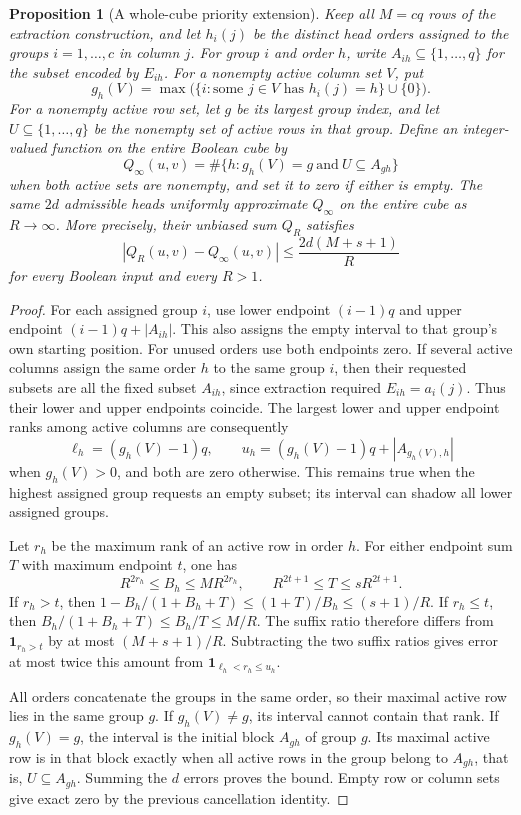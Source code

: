 \documentclass[11pt]{article}
\newtheorem{proposition}[theorem]{Proposition}
\newcommand{\1}{\mathbf 1}
\begin{document}
\begin{proposition}[A whole-cube priority extension]
Keep all $M=cq$ rows of the extraction construction, and let $h_i(j)$ be
the distinct head orders assigned to the groups $i=1,\ldots,c$ in column
$j$. For group $i$ and order $h$, write $A_{ih}\subseteq\{1,\ldots,q\}$
for the subset encoded by $E_{ih}$. For a nonempty active column set $V$,
put
\[
 g_h(V)=\max\bigl(\{i:\text{some }j\in V\text{ has }h_i(j)=h\}\cup\{0\}\bigr).
\]
For a nonempty active row set, let $g$ be its largest group index, and let
$U\subseteq\{1,\ldots,q\}$ be the nonempty set of active rows in that
group. Define an integer-valued function on the entire Boolean cube by
\[
 Q_\infty(u,v)=
 \#\{h:g_h(V)=g\ \text{and}\ U\subseteq A_{gh}\}
\]
when both active sets are nonempty, and set it to zero if either is empty.
The same $2d$ admissible heads uniformly approximate $Q_\infty$ on the
entire cube as $R\to\infty$. More precisely, their unbiased sum $Q_R$
satisfies
\[
 |Q_R(u,v)-Q_\infty(u,v)|\leq\frac{2d(M+s+1)}R
\]
for every Boolean input and every $R>1$.
\end{proposition}
\begin{proof}
For each assigned group $i$, use lower endpoint $(i-1)q$ and upper endpoint
$(i-1)q+|A_{ih}|$. This also assigns the empty interval to that group's
own starting position. For unused orders use both endpoints zero.
If several active columns assign the same order $h$ to the same group $i$,
then their requested subsets are all the fixed subset $A_{ih}$, since
extraction required $E_{ih}=a_i(j)$. Thus their lower and upper endpoints
coincide. The largest lower and upper endpoint ranks among active columns
are consequently
\[
 \ell_h=(g_h(V)-1)q,\qquad
 u_h=(g_h(V)-1)q+|A_{g_h(V),h}|
\]
when $g_h(V)>0$, and both are zero otherwise. This remains true when the
highest assigned group requests an empty subset; its interval can shadow
all lower assigned groups.

Let $r_h$ be the maximum rank of an active row in order $h$. For either
endpoint sum $T$ with maximum endpoint $t$, one has
\[
 R^{2r_h}\leq B_h\leq M R^{2r_h},\qquad
 R^{2t+1}\leq T\leq s R^{2t+1}.
\]
If $r_h>t$, then
$1-B_h/(1+B_h+T)\leq(1+T)/B_h\leq(s+1)/R$.
If $r_h\leq t$, then
$B_h/(1+B_h+T)\leq B_h/T\leq M/R$.
The suffix ratio therefore differs from $\mathbf1_{r_h>t}$ by at most
$(M+s+1)/R$. Subtracting the two suffix ratios gives error at most twice
this amount from $\mathbf1_{\ell_h<r_h\leq u_h}$.

All orders concatenate the groups in the same order, so their maximal
active row lies in the same group $g$. If $g_h(V)\neq g$, its interval
cannot contain that rank. If $g_h(V)=g$, the interval is the initial block
$A_{gh}$ of group $g$. Its maximal active row is in that block exactly
when all active rows in the group belong to $A_{gh}$, that is,
$U\subseteq A_{gh}$. Summing the $d$ errors proves the bound. Empty row or
column sets give exact zero by the previous cancellation identity.
\end{proof}
\end{document}
